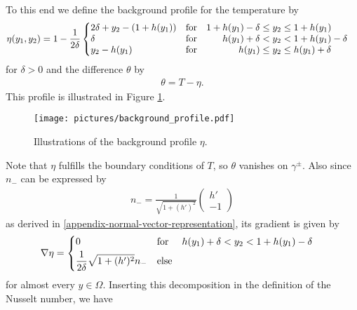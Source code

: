 \documentclass{article}
\theoremstyle{definition}
\theoremstyle{definition}
\begin{document}
To this end we define the background profile for the temperature by
\begin{align}
    \label{def-eta}
    \eta(y_1,y_2)=1-\frac{1}{2\delta}
    \begin{cases}
        \begin{aligned}
            &2\delta+y_2-(1+h(y_1)) & &\textnormal{for}& 1+h(y_1)-\delta&\leq y_2 \leq 1+h(y_1)\\
            &\delta & &\textnormal{for}& h(y_1)+\delta&< y_2 < 1+h(y_1)-\delta\\
            &y_2-h(y_1) & &\textnormal{for}& h(y_1)&\leq y_2 \leq h(y_1)+\delta
        \end{aligned}
    \end{cases}
\end{align}
for $\delta>0$ and the difference $\theta$ by
\begin{align}
    \label{def-theta}
    \theta = T-\eta.
\end{align}
This profile is illustrated in Figure \ref{fig:background_profile}.

\begin{figure}
    \begin{center}
        \texttt{[image: pictures/background\_profile.pdf]}
    \end{center}
    \caption{Illustrations of the background profile $\eta$.}
    \label{fig:background_profile}
\end{figure}

Note that $\eta$ fulfills the boundary conditions of $T$, so $\theta$ vanishes on $\gamma^\pm$. Also since $n_-$ can be expressed by
\begin{align*}
    n_- = \frac{1}{\sqrt{1+(h')^2}}\begin{pmatrix}h'\\ -1\end{pmatrix}
\end{align*}
as derived in \eqref{appendix-normal-vector-representation}, its gradient is given by
\begin{equation}
    \label{nabla-eta-identity}
    \nabla \eta = 
    \begin{cases}
        \begin{aligned}
            &0 &&\textnormal{for}& h(y_1)+\delta < y_2 < 1+h(y_1)-\delta \\%
            &\frac{1}{2\delta} \sqrt{1+(h')^2}n_- &&\textnormal{else}
        \end{aligned}
    \end{cases}
\end{equation}
for almost every $y\in \Omega$. 
Inserting this decomposition in the definition of the Nusselt number, we have
\end{document}
